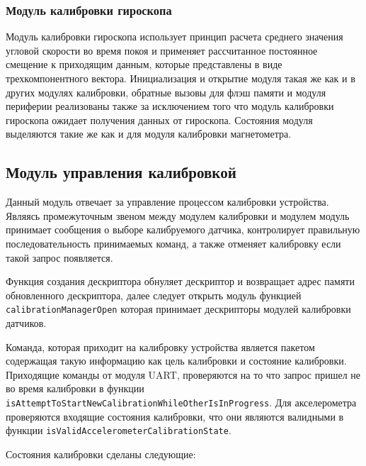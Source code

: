 \subsubsection{Модуль калибровки гироскопа}

Модуль калибровки гироскопа использует принцип расчета среднего значения угловой скорости во время покоя и применяет
рассчитанное постоянное смещение к приходящим данным, которые представлены в виде трехкомпонентного вектора.
Инициализация и открытие модуля такая же как и в других модулях калибровки,
обратные вызовы для флэш памяти и модуля периферии реализованы также за исключением того что модуль калибровки гироскопа ожидает получения данных от гироскопа.
Состояния модуля выделяются такие же как и для модуля калибровки магнетометра.

\subsection{Модуль управления калибровкой}

Данный модуль отвечает за управление процессом калибровки устройства. Являясь промежуточным звеном между модулем калибровки и модулем \moduleUart
модуль принимает сообщения о выборе калибруемого датчика, контролирует правильную последовательность принимаемых команд, а также отменяет
калибровку если такой запрос появляется.

Функция создания дескриптора обнуляет дескриптор и возвращает адрес памяти обновленного дескриптора, далее следует открыть модуль функцией
\lstinline{calibrationManagerOpen} которая принимает дескрипторы модулей калибровки датчиков.

Команда, которая приходит на калибровку устройства является пакетом содержащая такую информацию как цель калибровки и состояние калибровки.
Приходящие команды от модуля UART, проверяются на то что запрос пришел не во время калибровки в функции \lstinline{isAttemptToStartNewCalibrationWhileOtherIsInProgress}.
Для акселерометра проверяются входящие состояния калибровки, что они являются валидными в функции \lstinline{isValidAccelerometerCalibrationState}.

Состояния калибровки сделаны следующие:


